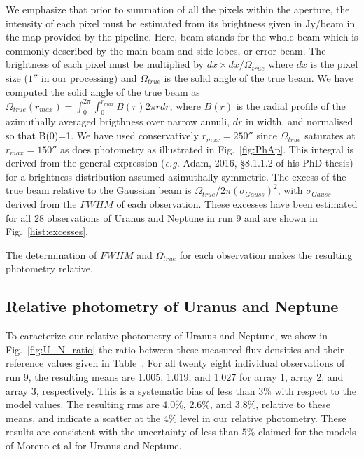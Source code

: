 We emphasize that prior to summation of all the pixels within the aperture, the intensity of each pixel must be estimated
from its brightness  given in Jy/beam in the map provided by the
pipeline. Here, beam stands  for the whole beam which is commonly 
described by the main beam and side lobes, or error beam. The brightness of each pixel must be multiplied by
$dx \times dx / \Omega_{true}$ where  $dx$ is the pixel size ($1''$ in our processing)
and $\Omega_{true}$  is the solid angle of the true beam.
We have computed the solid angle of the true beam as
$ \Omega_{true} (r_{max}) = \int_0^{2\pi} \int_0^{r_{max}} B(r) 2 \pi r dr$, where
$B(r)$ is the radial profile of the azimuthally averaged brigthness over narrow annuli,  $dr$ in width, and normalised so that B(0)=1.
We have used conservatively $r_{max}=250''$ since $ \Omega_{true}$  saturates at $r_{max}=150''$ as does photometry as illustrated
in Fig.~\ref{fig:PhAp}. This integral is derived from the general expression ({\it e.g.} Adam, 2016, \S 8.1.1.2 of his PhD thesis) for a
brightness distribution assumed azimuthally symmetric.  The excess
of the true beam relative to the Gaussian beam is $\Omega_{true} / 2 \pi (\sigma_{Gauss})^2$, with  $\sigma_{Gauss}$ derived from
the $FWHM$ of each observation. These excesses have been 
estimated  for all 28 observations of Uranus and Neptune in run 9 and are shown in Fig.~\ref{hist:excesses}.


The determination of $FWHM$ and $\Omega_{true}$  for each observation
makes the resulting photometry relative.


\subsection{Relative photometry of Uranus and Neptune}

To caracterize our relative photometry of Uranus and Neptune, we show in Fig.~\ref{fig:U_N_ratio} the ratio between these measured flux densities
and their reference values given in Table~\label{tab:fluxPred}.
For all twenty eight individual observations of run 9, the resulting means are 1.005,  1.019, and 1.027
for array 1, array 2, and array 3, respectively. This is a systematic bias of less than 3\% with respect to the model values.
The resulting rms are 4.0\%, 2.6\%, and 3.8\%, relative to these means, and indicate
a scatter at the 4\% level in our relative photometry.  These results are consistent with the uncertainty of less than
$5\%$ claimed for the models of Moreno et al for Uranus and Neptune.

